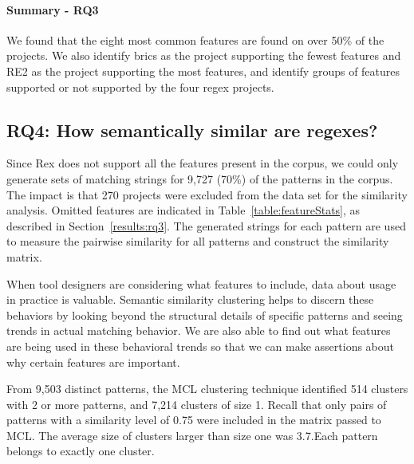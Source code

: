 \paragraph{Summary - RQ3}
We found that the eight most common features are found on over 50\% of the projects.
We also identify brics as the project supporting the fewest features and RE2 as the project supporting the most features, and identify groups of features supported or not supported by the four regex projects.


\subsection{RQ4: How semantically similar are regexes?}
\label{rq4:results}

 Since Rex does not support all the features present in the corpus, we could only generate sets of matching strings for 9,727 (70\%) of the  patterns in the corpus. The impact is that 270 projects were excluded from the data set for the similarity analysis. Omitted features are indicated in Table~\ref{table:featureStats}, as described in Section~\ref{results:rq3}.
The generated strings for each pattern are used to measure the pairwise similarity for all patterns and construct the similarity matrix.


When tool designers are considering what features to include, data about usage in practice is valuable.  Semantic similarity clustering  helps to discern these behaviors by looking beyond the structural details of specific patterns and seeing trends in actual matching behavior.  We are also able to find out what features are being used in these behavioral trends so that we can make assertions about why certain features are important.

From 9,503 distinct patterns, the MCL clustering technique identified 514 clusters with 2 or more patterns, and 7,214 clusters of size 1.  Recall that only pairs of patterns with a similarity level of 0.75 were included in the matrix passed to MCL.  The average size of clusters larger than size one was 3.7.Each pattern belongs to exactly one cluster.

